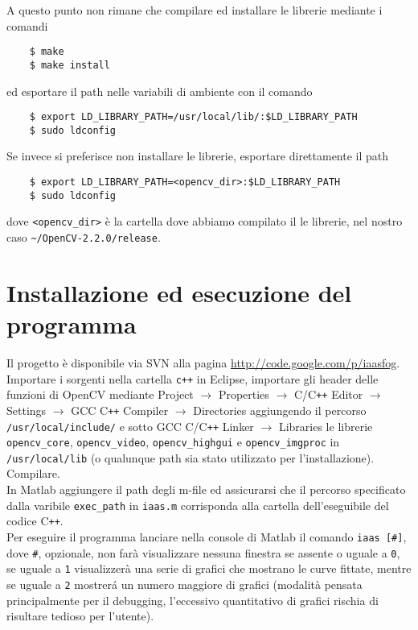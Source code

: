 \documentclass[12pt]{report}
\begin{document}
\noindent A questo punto non rimane che compilare ed installare le librerie mediante i comandi

\begin{verbatim}
	$ make
	$ make install
\end{verbatim}

\noindent ed esportare il path nelle variabili di ambiente con il comando

\begin{verbatim}
	$ export LD_LIBRARY_PATH=/usr/local/lib/:$LD_LIBRARY_PATH
	$ sudo ldconfig
\end{verbatim}

\noindent Se invece si preferisce non installare le librerie, esportare direttamente il path 

\begin{verbatim}
	$ export LD_LIBRARY_PATH=<opencv_dir>:$LD_LIBRARY_PATH
	$ sudo ldconfig
\end{verbatim}

\noindent dove \verb|<opencv_dir>| \`e la cartella dove abbiamo compilato il le librerie, nel nostro caso \verb|~/OpenCV-2.2.0/release|.

\section{Installazione ed esecuzione del programma}
\noindent Il progetto \`e disponibile via SVN alla pagina \url{http://code.google.com/p/iaasfog}.\\
Importare i sorgenti nella cartella \verb|c++| in Eclipse, importare gli header delle funzioni di OpenCV mediante Project $\rightarrow$ Properties  $\rightarrow$ C\slash C\verb|++| Editor $\rightarrow$ Settings $\rightarrow$ GCC C\verb|++| Compiler $\rightarrow$ Directories aggiungendo il percorso \verb|/usr/local/include/| e sotto GCC C\slash C\verb|++| Linker $\rightarrow$ Libraries le librerie \verb|opencv_core|, \verb|opencv_video|, \verb|opencv_highgui| e \verb|opencv_imgproc| in \verb|/usr/local/lib| (o qualunque path sia stato utilizzato per l'installazione).\\
Compilare.\\

\noindent In Matlab aggiungere il path degli m-file ed assicurarsi che il percorso specificato dalla varibile \verb|exec_path| in \verb|iaas.m| corrisponda alla cartella dell'eseguibile del codice C\verb|++|.\\
Per eseguire il programma lanciare nella console di Matlab il comando \verb|iaas [#]|, dove \verb|#|, opzionale, non far\`a visualizzare nessuna finestra se assente o uguale a \verb|0|, se uguale a \verb|1| visualizzer\`a una serie di grafici che mostrano le curve fittate, mentre se uguale a \verb|2| mostrer\'a un numero maggiore di grafici (modalit\`a pensata principalmente per il debugging, l'eccessivo quantitativo di grafici rischia di risultare tedioso per l'utente).

\printbibliography
\end{document}
